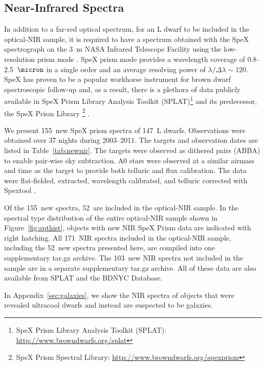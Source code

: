 \documentclass[modern]{aastex61}
\newcommand{\sample}{171}
\newcommand{\NewPrismSpectra}{155} %
\newcommand{\NewPrismObjects}{147} %
\newcommand{\NewPrisminSample}{52}
\begin{document}
\movetabledown=2.00in



\subsection{Near-Infrared Spectra}

In addition to a far-red optical spectrum, for an L dwarf to be included in the optical-NIR sample, it is required to have a spectrum obtained with the SpeX spectrograph on the 3~m NASA Infrared Telescope Facility using the low-resolution prism mode \citep{Spex}.
SpeX prism mode provides a wavelength coverage of 0.8--2.5~$\micron$ in a single order and an average resolving power of $\lambda/\Delta\lambda\sim120$.
SpeX has proven to be a popular workhorse instrument for brown dwarf spectroscopic follow-up and, as a result, there is a plethora of data publicly available in SpeX Prism Library Analysis Toolkit (SPLAT)\footnote{SpeX Prism Library Analysis Toolkit (SPLAT): \url{http://www.browndwarfs.org/splat}} and its predecessor, the SpeX Prism Library \footnote{SpeX Prism Spectral Library: \url{http://www.browndwarfs.org/spexprism}} \citep{Burgasser:2014tr}.

\label{sec:obs_new_nir}
We present \NewPrismSpectra~new SpeX prism spectra of \NewPrismObjects~L dwarfs.
Observations were obtained over 37 nights during 2003--2011. The targets and observation dates are listed in Table~\ref{tab:newnir}.
The targets were observed as dithered pairs (ABBA) to enable pair-wise sky subtraction. A0 stars were observed at a similar airmass and time as the target to provide both telluric and flux calibration.
The data were flat-fielded, extracted, wavelength calibrated, and telluric corrected with Spextool \citep{Cushing04,Spextool2}.

Of the \NewPrismSpectra~new spectra, \NewPrisminSample~are included in the optical-NIR sample.
In the spectral type distribution of the entire optical-NIR sample shown in Figure~\ref{fig:spthist}, objects with new NIR SpeX Prism data are indicated with right hatching.
All \sample~NIR spectra included in the optical-NIR sample, including the \NewPrisminSample~new spectra presented here, are compiled into one supplementary tar.gz archive. The 103~new NIR spectra not included in the sample are in a separate supplementary tar.gz archive. All of these data are also available from SPLAT and the BDNYC Database.

In Appendix~\ref{sec:galaxies}, we show the NIR spectra of objects that were revealed  ultracool dwarfs and instead are suspected to be galaxies.
\end{document}
